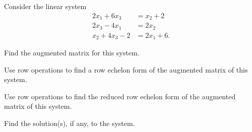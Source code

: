 \label{sec:row_ech_exam}

\ExampleIntro

\begin{example} Consider the linear system
\begin{align*}
2x_1 + 6x_3 &= x_2 + 2  \\
2x_3 - 4x_1  &=  2x_2\\
x_2 + 4x_3 - 2 &= 2x_1 + 6.
\end{align*}
	\ba
	\item Find the augmented matrix for this system.
	\item Use row operations to find a row echelon form of the augmented matrix of this system.
	\item Use row operations to find the reduced row echelon form of the augmented matrix of this system. 
	\item Find the solution(s), if any, to the system.
	\ea
	

\end{example}
